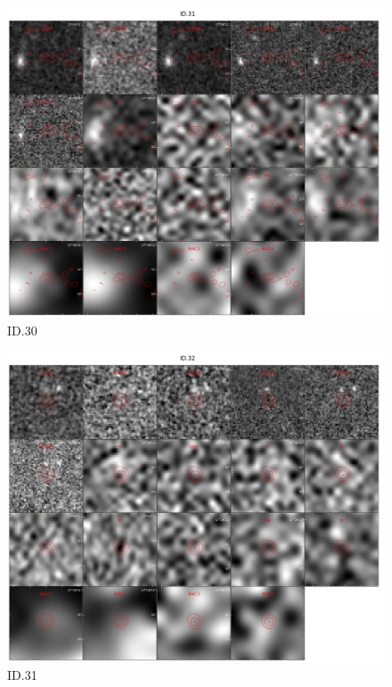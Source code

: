 \begin{figure}[tbp]
\centering \includegraphics[width=120mm]{Matched/ASPECS_Cutout_30.jpg}
\caption{ID.30}
\label{fig:Match_Three}
\end{figure}

\begin{figure}[tbp]
\centering \includegraphics[width=120mm]{Matched/ASPECS_Cutout_31.jpg}
\caption{ID.31}
\label{fig:Match_Three}
\end{figure}

